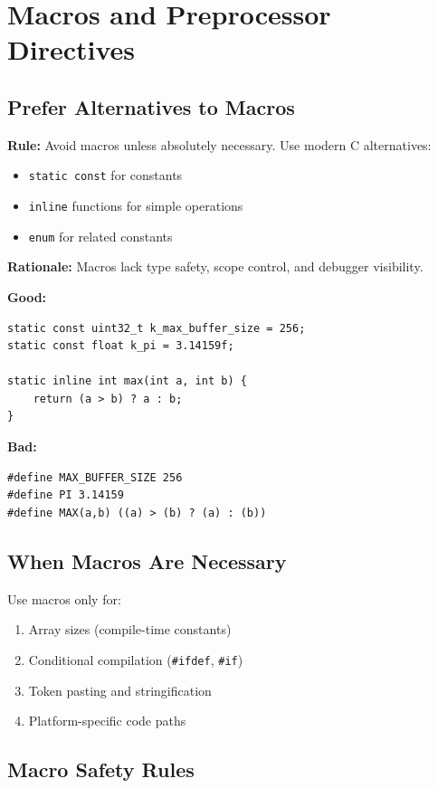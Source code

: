 \section{Macros and Preprocessor Directives}

\subsection{Prefer Alternatives to Macros}

\textbf{Rule:} Avoid macros unless absolutely necessary. Use modern C alternatives:

\begin{itemize}
    \item \texttt{static const} for constants
    \item \texttt{inline} functions for simple operations
    \item \texttt{enum} for related constants
\end{itemize}

\textbf{Rationale:} Macros lack type safety, scope control, and debugger visibility.

\textbf{Good:}
\begin{verbatim}
static const uint32_t k_max_buffer_size = 256;
static const float k_pi = 3.14159f;

static inline int max(int a, int b) {
    return (a > b) ? a : b;
}
\end{verbatim}

\textbf{Bad:}
\begin{verbatim}
#define MAX_BUFFER_SIZE 256
#define PI 3.14159
#define MAX(a,b) ((a) > (b) ? (a) : (b))
\end{verbatim}

\subsection{When Macros Are Necessary}

Use macros only for:

\begin{enumerate}
    \item Array sizes (compile-time constants)
    \item Conditional compilation (\texttt{\#ifdef}, \texttt{\#if})
    \item Token pasting and stringification
    \item Platform-specific code paths
\end{enumerate}

\subsection{Macro Safety Rules}

